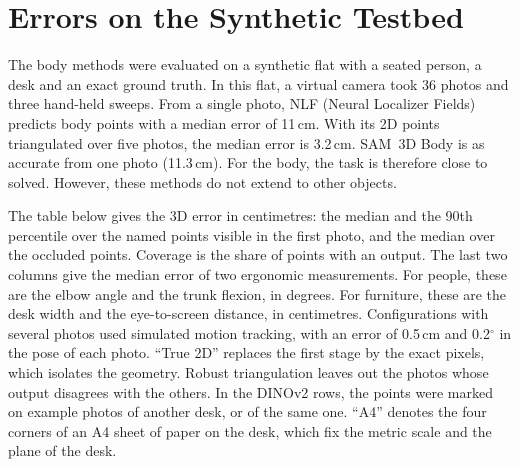\section{Errors on the Synthetic Testbed}\label{app:errors}
The body methods were evaluated on a synthetic flat with a seated person, a desk and an exact ground truth.
In this flat, a virtual camera took 36 photos and three hand-held sweeps.
From a single photo, NLF (Neural Localizer Fields) predicts body points with a median error of 11\,cm.
With its 2D points triangulated over five photos, the median error is 3.2\,cm.
SAM~3D Body is as accurate from one photo (11.3\,cm).
For the body, the task is therefore close to solved.
However, these methods do not extend to other objects.

The table below gives the 3D error in centimetres: the median and the 90th percentile over the named points visible in the first photo, and the median over the occluded points.
Coverage is the share of points with an output.
The last two columns give the median error of two ergonomic measurements.
For people, these are the elbow angle and the trunk flexion, in degrees.
For furniture, these are the desk width and the eye-to-screen distance, in centimetres.
Configurations with several photos used simulated motion tracking, with an error of 0.5\,cm and 0.2$^\circ$ in the pose of each photo.
``True 2D'' replaces the first stage by the exact pixels, which isolates the geometry.
Robust triangulation leaves out the photos whose output disagrees with the others.
In the DINOv2 rows, the points were marked on example photos of another desk, or of the same one.
``A4'' denotes the four corners of an A4 sheet of paper on the desk, which fix the metric scale and the plane of the desk.

